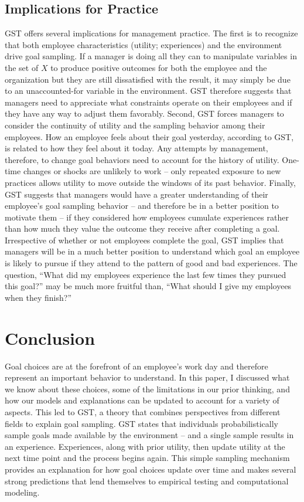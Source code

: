 \documentclass[english,man]{apa6}
\theoremstyle{definition}
\theoremstyle{definition}
\theoremstyle{definition}
\theoremstyle{remark}
\begin{document}
\subsection{Implications for Practice}\label{implications-for-practice}

GST offers several implications for management practice. The first is to
recognize that both employee characteristics (utility; experiences) and
the environment drive goal sampling. If a manager is doing all they can
to manipulate variables in the set of \(X\) to produce positive outcomes
for both the employee and the organization but they are still
dissatisfied with the result, it may simply be due to an unaccounted-for
variable in the environment. GST therefore suggests that managers need
to appreciate what constraints operate on their employees and if they
have any way to adjust them favorably. Second, GST forces managers to
consider the continuity of utility and the sampling behavior among their
employees. How an employee feels about their goal yesterday, according
to GST, is related to how they feel about it today. Any attempts by
management, therefore, to change goal behaviors need to account for the
history of utility. One-time changes or shocks are unlikely to work --
only repeated exposure to new practices allows utility to move outside
the windows of its past behavior. Finally, GST suggests that managers
would have a greater understanding of their employee's goal sampling
behavior -- and therefore be in a better position to motivate them -- if
they considered how employees cumulate experiences rather than how much
they value the outcome they receive after completing a goal.
Irrespective of whether or not employees complete the goal, GST implies
that managers will be in a much better position to understand which goal
an employee is likely to pursue if they attend to the pattern of good
and bad experiences. The question, \enquote{What did my employees
experience the last few times they pursued this goal?} may be much more
fruitful than, \enquote{What should I give my employees when they
finish?}

\section{Conclusion}\label{conclusion}

Goal choices are at the forefront of an employee's work day and
therefore represent an important behavior to understand. In this paper,
I discussed what we know about these choices, some of the limitations in
our prior thinking, and how our models and explanations can be updated
to account for a variety of aspects. This led to GST, a theory that
combines perspectives from different fields to explain goal sampling.
GST states that individuals probabilistically sample goals made
available by the environment -- and a single sample results in an
experience. Experiences, along with prior utility, then update utility
at the next time point and the process begins again. This simple
sampling mechanism provides an explanation for how goal choices update
over time and makes several strong predictions that lend themselves to
empirical testing and computational modeling.
\end{document}
